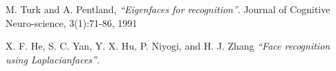 \begin{thebibliography}{9}

  M. Turk and A. Pentland,
  \emph{“Eigenfaces for recognition”}.
  Journal of Cognitive Neuro-science,
  3(1):71-86,
  1991

  X. F. He, S. C. Yan, Y. X. Hu, P. Niyogi, and H. J. Zhang
  \emph{“Face recognition using Laplacianfaces”}.

\end{thebibliography}

